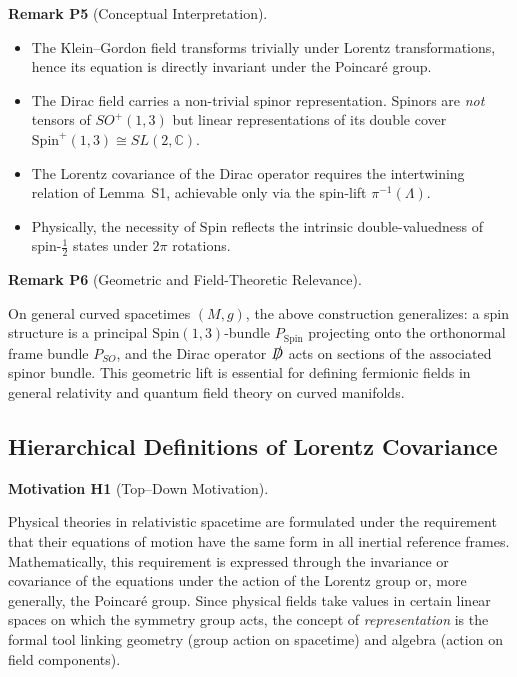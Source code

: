 \documentclass[10pt, letterpaper]{article}
\newcommand{\C}{\mathbb{C}}
\newcommand{\Spin}{\mathrm{Spin}}
\newcommand{\CustomHeading}[3]{%
  \par\medskip\noindent%
  \textbf{#1 #2} \textnormal{(#3)}.\enskip%
}
\newenvironment{REM}[2]{\begin{unitbox}\CustomHeading{Remark}{#1}{#2}}{\end{unitbox}}
\newenvironment{MOT}[2]{\begin{unitbox}\CustomHeading{Motivation}{#1}{#2}}{\end{unitbox}}
\begin{document}
\begin{REM}{P5}{Conceptual Interpretation}
\begin{itemize}
\item The Klein--Gordon field transforms trivially under Lorentz transformations, hence its equation is directly invariant under the Poincaré group.
\item The Dirac field carries a non-trivial spinor representation.  Spinors are \emph{not} tensors of $SO^+(1,3)$ but linear representations of its double cover $\Spin^+(1,3)\cong SL(2,\C)$.
\item The Lorentz covariance of the Dirac operator requires the intertwining relation of Lemma~S1, achievable only via the spin-lift $\pi^{-1}(\Lambda)$.
\item Physically, the necessity of $\Spin$ reflects the intrinsic double-valuedness of spin-$\tfrac12$ states under $2\pi$ rotations.
\end{itemize}
\end{REM}

\begin{REM}{P6}{Geometric and Field-Theoretic Relevance}
On general curved spacetimes $(M,g)$, the above construction generalizes:
a spin structure is a principal $\Spin(1,3)$-bundle $P_{\Spin}$ projecting onto the orthonormal frame bundle $P_{SO}$,
and the Dirac operator $\slashed{D}$ acts on sections of the associated spinor bundle.
This geometric lift is essential for defining fermionic fields in general relativity and quantum field theory on curved manifolds.
\end{REM}



\subsection{Hierarchical Definitions of Lorentz Covariance}

\begin{MOT}{H1}{Top--Down Motivation}
Physical theories in relativistic spacetime are formulated under the requirement that their equations of motion have the same form in all inertial reference frames.  
Mathematically, this requirement is expressed through the invariance or covariance of the equations under the action of the Lorentz group or, more generally, the Poincaré group.  
Since physical fields take values in certain linear spaces on which the symmetry group acts, the concept of \emph{representation} is the formal tool linking geometry (group action on spacetime) and algebra (action on field components).
\end{MOT}
\end{document}
